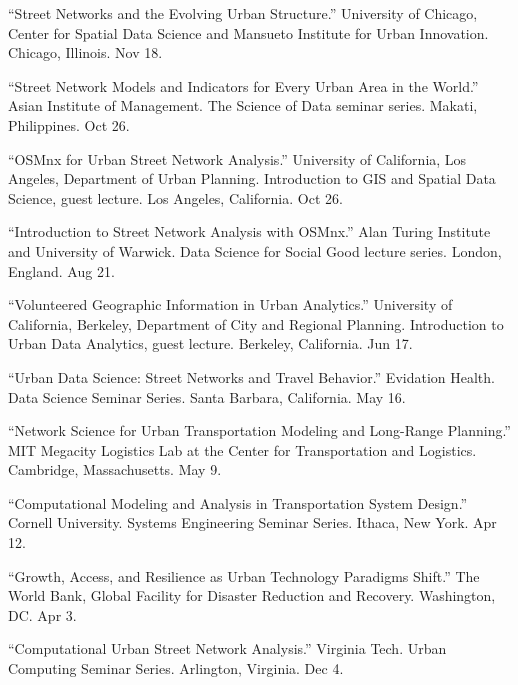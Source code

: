 \documentclass[11pt,a4paper]{report} %
\begin{document}
\begin{tablist}
\item[2020] \tab{}\enquote{Street Networks and the Evolving Urban Structure.} University of Chicago, Center for Spatial Data Science and Mansueto Institute for Urban Innovation. Chicago, Illinois. Nov 18.

\item[2020] \tab{}\enquote{Street Network Models and Indicators for Every Urban Area in the World.} Asian Institute of Management. The Science of Data seminar series. Makati, Philippines. Oct 26.

\item[2020] \tab{}\enquote{OSMnx for Urban Street Network Analysis.} University of California, Los Angeles, Department of Urban Planning. Introduction to GIS and Spatial Data Science, guest lecture. Los Angeles, California. Oct 26.

\item[2020] \tab{}\enquote{Introduction to Street Network Analysis with OSMnx.} Alan Turing Institute and University of Warwick. Data Science for Social Good lecture series. London, England. Aug 21.

\item[2020] \tab{}\enquote{Volunteered Geographic Information in Urban Analytics.} University of California, Berkeley, Department of City and Regional Planning. Introduction to Urban Data Analytics, guest lecture. Berkeley, California. Jun 17.

\item[2019] \tab{}\enquote{Urban Data Science: Street Networks and Travel Behavior.} Evidation Health. Data Science Seminar Series. Santa Barbara, California. May 16.

\item[2019] \tab{}\enquote{Network Science for Urban Transportation Modeling and Long-Range Planning.} MIT Megacity Logistics Lab at the Center for Transportation and Logistics. Cambridge, Massachusetts. May 9.

\item[2019] \tab{}\enquote{Computational Modeling and Analysis in Transportation System Design.} Cornell University. Systems Engineering Seminar Series. Ithaca, New York. Apr 12.

\item[2019] \tab{}\enquote{Growth, Access, and Resilience as Urban Technology Paradigms Shift.} The World Bank, Global Facility for Disaster Reduction and Recovery. Washington, DC\@. Apr 3.

\item[2018] \tab{}\enquote{Computational Urban Street Network Analysis.} Virginia Tech. Urban Computing Seminar Series. Arlington, Virginia. Dec 4.


\end{tablist}
\end{document}
